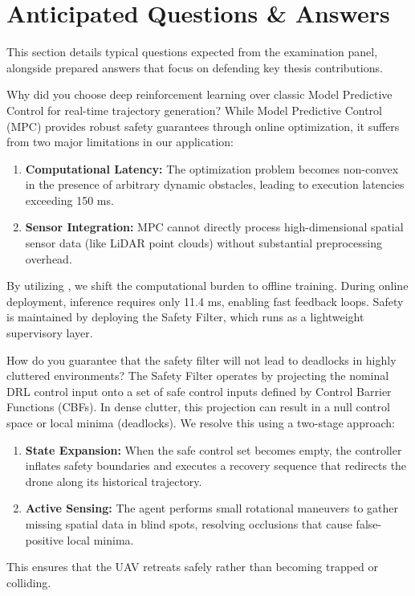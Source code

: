 \chapter{Anticipated Questions \& Answers}
\label{ch:questions}

This section details typical questions expected from the examination panel, alongside prepared answers that focus on defending key thesis contributions.

\begin{questionbox}{Why did you choose deep reinforcement learning over classic Model Predictive Control for real-time trajectory generation?}
While Model Predictive Control (MPC) provides robust safety guarantees through online optimization, it suffers from two major limitations in our application:
\begin{enumerate}
  \item \textbf{Computational Latency:} The optimization problem becomes non-convex in the presence of arbitrary dynamic obstacles, leading to execution latencies exceeding 150 ms.
  \item \textbf{Sensor Integration:} MPC cannot directly process high-dimensional spatial sensor data (like LiDAR point clouds) without substantial preprocessing overhead.
\end{enumerate}
By utilizing , we shift the computational burden to offline training. During online deployment, inference requires only 11.4 ms, enabling fast feedback loops. Safety is maintained by deploying the  Safety Filter, which runs as a lightweight supervisory layer.
\end{questionbox}

\begin{questionbox}{How do you guarantee that the safety filter will not lead to deadlocks in highly cluttered environments?}
The  Safety Filter operates by projecting the nominal DRL control input onto a set of safe control inputs defined by Control Barrier Functions (CBFs). In dense clutter, this projection can result in a null control space or local minima (deadlocks). We resolve this using a two-stage approach:
\begin{enumerate}
  \item \textbf{State Expansion:} When the safe control set becomes empty, the controller inflates safety boundaries and executes a recovery sequence that redirects the drone along its historical trajectory.
  \item \textbf{Active Sensing:} The agent performs small rotational maneuvers to gather missing spatial data in blind spots, resolving occlusions that cause false-positive local minima.
\end{enumerate}
This ensures that the UAV retreats safely rather than becoming trapped or colliding.
\end{questionbox}

